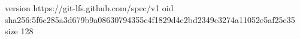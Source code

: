 version https://git-lfs.github.com/spec/v1
oid sha256:5f6c285a3d679b9a08630794355c4f1829d4e2bd2349c3274a11052e5af25e35
size 128
